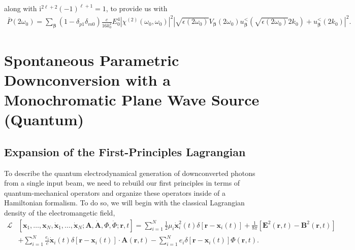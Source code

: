 \documentclass{article}
\begin{document}
along with $\mathrm{i}^{2\ell + 2}(-1)^{\ell + 1} = 1$, to provide us with
\begin{equation}
\begin{split}
\bar{P}(2\omega_0) = \sum_{\bm{\beta}}(1 - \delta_{p1}\delta_{m0})\frac{c}{16k_0^2}E_0^4\left|\chi^{(2)}(\omega_0,\omega_0)\right|^2\left|\sqrt{\epsilon(2\omega_0)}V_{\bm{\beta}}(2\omega_0)u_{\bm{\beta}}^<\!\left(\sqrt{\epsilon(2\omega_0)}2k_0\right) + u_{\bm{\beta}}^<(2k_0)\right|^2.
\end{split}
\end{equation}
























\newpage
\section{Spontaneous Parametric Downconversion with a Monochromatic Plane Wave Source (Quantum)}\label{sec:SPDCquantum}





\subsection{Expansion of the First-Principles Lagrangian}\label{sec:LagrangianExpansion}

To describe the quantum electrodynamical generation of downconverted photons from a single input beam, we need to rebuild our first principles in terms of quantum-mechanical operators and organize these operators inside of a Hamiltonian formalism. To do so, we will begin with the classical Lagrangian density of the electromangetic field,
\begin{equation}\label{eq:lagrangianDensity1}
\begin{split}
\mathcal{L}&\left[\mathbf{x}_1,\ldots,\mathbf{x}_N,\dot{\mathbf{x}}_1,\ldots,\dot{\mathbf{x}}_N;\mathbf{A},\dot{\mathbf{A}},\Phi,\dot{\Phi};\mathbf{r},t\right] = \sum_{i = 1}^N\frac{1}{2}\mu_i\dot{\mathbf{x}}_i^2(t)\delta[\mathbf{r} - \mathbf{x}_i(t)] + \frac{1}{8\pi}\left[\mathbf{E}^2(\mathbf{r},t) - \mathbf{B}^2(\mathbf{r},t)\right]\\
&+ \sum_{i = 1}^N\frac{e_i}{c}\dot{\mathbf{x}}_i(t)\delta[\mathbf{r} - \mathbf{x}_i(t)]\cdot\mathbf{A}(\mathbf{r},t) - \sum_{i = 1}^Ne_i\delta[\mathbf{r} - \mathbf{x}_i(t)]\Phi(\mathbf{r},t).
\end{split}
\end{equation}
\end{document}
